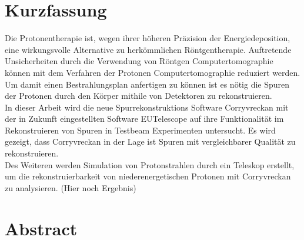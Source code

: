 \thispagestyle{plain}

\section*{Kurzfassung}
Die Protonentherapie ist, wegen ihrer höheren Präzision der Energiedeposition, eine wirkungsvolle Alternative zu herkömmlichen Röntgentherapie.
Auftretende Unsicherheiten durch die Verwendung von Röntgen Computertomographie können mit dem Verfahren der Protonen Computertomographie reduziert werden.
Um damit einen Bestrahlungsplan anfertigen zu können ist es nötig die Spuren der Protonen durch den Körper mithile von Detektoren zu rekonstruieren. \\
In dieser Arbeit wird die neue Spurrekonstruktions Software Corryvreckan mit der in Zukunft eingestellten Software EUTelescope auf ihre Funktionalität im
Rekonstruieren von Spuren in Testbeam Experimenten untersucht. Es wird gezeigt, dass Corryvreckan in der Lage ist Spuren mit vergleichbarer Qualität zu rekonstruieren.\\
Des Weiteren werden Simulation von Protonstrahlen durch ein Teleskop erstellt, um die rekonstruierbarkeit von niederenergetischen Protonen
mit Corryvreckan zu analysieren. (Hier noch Ergebnis)

\section*{Abstract}
\begin{english}




\end{english}
